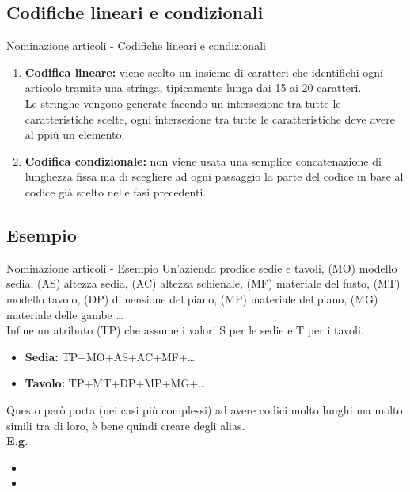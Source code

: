 \documentclass{beamer}
\begin{document}
    \subsection{Codifiche lineari e condizionali}
    \begin{frame}{Nominazione articoli - Codifiche lineari e condizionali}
        \begin{enumerate}
            \item \textbf{Codifica lineare:} viene scelto un insieme di caratteri che identifichi ogni articolo tramite una stringa, tipicamente lunga dai 15 ai 20 caratteri.\\
                Le stringhe vengono generate facendo un intersezione tra tutte le caratteristiche scelte, ogni intersezione tra tutte le caratteristiche deve avere al ppiù un elemento.
            \item \textbf{Codifica condizionale:} non viene usata una semplice concatenazione di lunghezza fissa ma di scegliere ad ogni passaggio la parte del codice in base al codice già scelto nelle fasi precedenti. 
        \end{enumerate}
    \end{frame}

    \subsection{Esempio}
    \begin{frame}{Nominazione articoli - Esempio}
        Un'azienda prodice sedie e tavoli, (MO) modello sedia, (AS) altezza sedia, (AC) altezza schienale, (MF) materiale del fusto, (MT) modello tavolo, (DP) dimensione del piano, (MP) materiale del piano, (MG) materiale delle gambe \dots\\
        Infine un atributo (TP) che assume i valori S per le sedie e T per i tavoli.\\
        \begin{itemize}
            \item \textbf{Sedia:} TP+MO+AS+AC+MF+\dots
            \item \textbf{Tavolo:} TP+MT+DP+MP+MG+\dots
        \end{itemize}
        Questo però porta (nei casi più complessi) ad avere codici molto lunghi ma molto simili tra di loro, è bene quindi creare degli alias.\\
        \textbf{E.g.}\\
        \begin{itemize}
            \item \color{red}{Luxury01}
            \item \color{blue}{Luxury02}
        \end{itemize}
    \end{frame}
\end{document}
